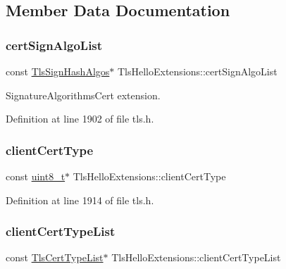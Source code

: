 \subsection{Member Data Documentation}
\mbox{\label{structTlsHelloExtensions_a640637c05b8aec2ef15420d5005830cb}} 
\subsubsection{\texorpdfstring{cert\+Sign\+Algo\+List}{certSignAlgoList}}
{\footnotesize\ttfamily const \hyperlink{tls_8h_a52f8ea223987ee1e857b6687f38d3888}{Tls\+Sign\+Hash\+Algos}$\ast$ Tls\+Hello\+Extensions\+::cert\+Sign\+Algo\+List}



Signature\+Algorithms\+Cert extension. 



Definition at line 1902 of file tls.\+h.

\mbox{\label{structTlsHelloExtensions_a763ae23601c4eb7b1ec11230ef1f88ed}} 
\subsubsection{\texorpdfstring{client\+Cert\+Type}{clientCertType}}
{\footnotesize\ttfamily const \hyperlink{stdint_8h_aba7bc1797add20fe3efdf37ced1182c5}{uint8\+\_\+t}$\ast$ Tls\+Hello\+Extensions\+::client\+Cert\+Type}



Definition at line 1914 of file tls.\+h.

\mbox{\label{structTlsHelloExtensions_a3091449503c4dcce58f3e62d70c24cd0}} 
\subsubsection{\texorpdfstring{client\+Cert\+Type\+List}{clientCertTypeList}}
{\footnotesize\ttfamily const \hyperlink{tls_8h_aef3d0205a40e8c95b8d7019053d3e7ca}{Tls\+Cert\+Type\+List}$\ast$ Tls\+Hello\+Extensions\+::client\+Cert\+Type\+List}



